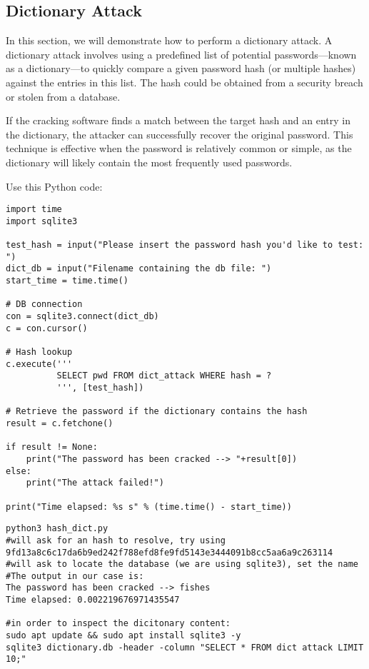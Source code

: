 \subsection{Dictionary Attack}

In this section, we will demonstrate how to perform a dictionary attack. A dictionary attack involves using a predefined list of potential passwords—known as a dictionary—to quickly compare a given password hash (or multiple hashes) against the entries in this list. The hash could be obtained from a security breach or stolen from a database.

If the cracking software finds a match between the target hash and an entry in the dictionary, the attacker can successfully recover the original password. This technique is effective when the password is relatively common or simple, as the dictionary will likely contain the most frequently used passwords.





Use this Python code:
\begin{lstlisting}[style=pythonStyle]
import time
import sqlite3

test_hash = input("Please insert the password hash you'd like to test: ")
dict_db = input("Filename containing the db file: ")
start_time = time.time()

# DB connection
con = sqlite3.connect(dict_db)
c = con.cursor()

# Hash lookup
c.execute('''
          SELECT pwd FROM dict_attack WHERE hash = ?
          ''', [test_hash])

# Retrieve the password if the dictionary contains the hash
result = c.fetchone()

if result != None:
    print("The password has been cracked --> "+result[0])
else:
    print("The attack failed!")

print("Time elapsed: %s s" % (time.time() - start_time))

\end{lstlisting}

\begin{lstlisting}[style=bashStyle]
python3 hash_dict.py 
#will ask for an hash to resolve, try using
9fd13a8c6c17da6b9ed242f788efd8fe9fd5143e3444091b8cc5aa6a9c263114
#will ask to locate the database (we are using sqlite3), set the name
#The output in our case is:
The password has been cracked --> fishes
Time elapsed: 0.002219676971435547

#in order to inspect the dicitonary content: 
sudo apt update && sudo apt install sqlite3 -y
sqlite3 dictionary.db -header -column "SELECT * FROM dict attack LIMIT 10;"
\end{lstlisting}

